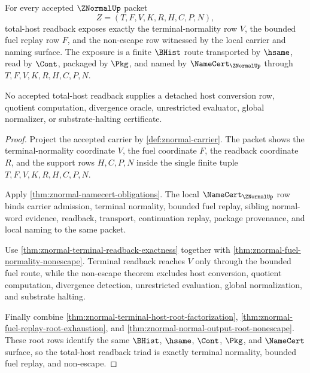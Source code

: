 \begin{theorem}
\label{thm:znormal-root-total-host-readback-triad}
For every accepted $\ZNormalUp$ packet
$$
Z=(T,F,V,K,R,H,C,P,N),
$$
total-host readback exposes exactly the terminal-normality row $V$, the
bounded fuel replay row $F$, and the non-escape row witnessed by the local
carrier and naming surface. The exposure is a finite $\BHist$ route transported
by $\hsame$, read by $\Cont$, packaged by $\Pkg$, and named by
$\NameCert_{\ZNormalUp}$ through $T,F,V,K,R,H,C,P,N$.

No accepted total-host readback supplies a detached host conversion row,
quotient computation, divergence oracle, unrestricted evaluator, global
normalizer, or substrate-halting certificate.
\end{theorem}
\begin{proof}
Project the accepted carrier by \autoref{def:znormal-carrier}. The packet
shows the terminal-normality coordinate $V$, the fuel coordinate $F$, the
readback coordinate $R$, and the support rows $H,C,P,N$ inside the single
finite tuple $T,F,V,K,R,H,C,P,N$.

Apply \autoref{thm:znormal-namecert-obligations}. The local
$\NameCert_{\ZNormalUp}$ row binds carrier admission, terminal normality,
bounded fuel replay, sibling normal-word evidence, readback, transport,
continuation replay, package provenance, and local naming to the same packet.

Use \autoref{thm:znormal-terminal-readback-exactness} together with
\autoref{thm:znormal-fuel-normality-nonescape}. Terminal readback reaches $V$
only through the bounded fuel route, while the non-escape theorem excludes
host conversion, quotient computation, divergence detection, unrestricted
evaluation, global normalization, and substrate halting.

Finally combine \autoref{thm:znormal-terminal-host-root-factorization},
\autoref{thm:znormal-fuel-replay-root-exhaustion}, and
\autoref{thm:znormal-normal-output-root-nonescape}. These root rows identify
the same $\BHist$, $\hsame$, $\Cont$, $\Pkg$, and $\NameCert$ surface, so the
total-host readback triad is exactly terminal normality, bounded fuel replay,
and non-escape.
\end{proof}

